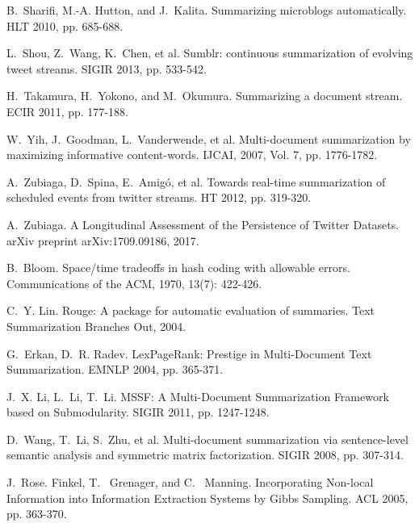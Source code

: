 \documentclass[runningheads]{llncs}
\begin{document}
\begin{thebibliography}{8}
B.~Sharifi, M.-A. Hutton, and J.~Kalita.
\newblock Summarizing microblogs automatically.
\newblock HLT 2010, pp. 685-688.

L.~Shou, Z.~Wang, K.~Chen, et al.
\newblock Sumblr: continuous summarization of evolving tweet streams.
\newblock SIGIR 2013, pp. 533-542.

H.~Takamura, H.~Yokono, and M.~Okumura.
\newblock Summarizing a document stream.
\newblock ECIR 2011, pp. 177-188.

W.~Yih, J.~Goodman, L.~Vanderwende, et al.
\newblock Multi-document summarization by maximizing informative content-words.
\newblock IJCAI, 2007, Vol. 7, pp. 1776-1782.

A.~Zubiaga, D.~Spina, E.~Amig\'{o}, et al.
\newblock Towards real-time summarization of scheduled events from twitter streams.
\newblock HT 2012, pp. 319-320.

A.~Zubiaga.
\newblock A Longitudinal Assessment of the Persistence of Twitter Datasets.
\newblock arXiv preprint arXiv:1709.09186, 2017.

B.~Bloom.
\newblock Space/time tradeoffs in hash coding with allowable errors.
\newblock Communications of the ACM, 1970, 13(7): 422-426.

C.~Y. Lin.
\newblock Rouge: A package for automatic evaluation of summaries.
\newblock Text Summarization Branches Out, 2004.

G.~Erkan, D.~R. Radev.
\newblock LexPageRank: Prestige in Multi-Document Text Summarization.
\newblock EMNLP 2004, pp. 365-371.

J.~X. Li, L.~Li, T.~Li.
\newblock MSSF: A Multi-Document Summarization Framework based on Submodularity.
\newblock  SIGIR 2011, pp. 1247-1248.

D.~Wang, T.~Li, S.~Zhu, et al.
\newblock Multi-document summarization via sentence-level semantic analysis and symmetric matrix factorization.
\newblock SIGIR 2008, pp. 307-314.

J.~Rose. Finkel, T.~ Grenager, and C.~ Manning.
\newblock Incorporating Non-local Information into Information Extraction Systems by Gibbs Sampling.
\newblock ACL 2005, pp. 363-370.

\end{thebibliography}
\end{document}
